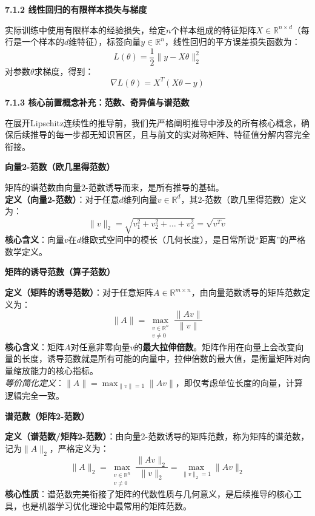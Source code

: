 \documentclass[10pt]{article}
\numberwithin{equation}{section}
\theoremstyle{plain}
\theoremstyle{definition}
\theoremstyle{remark}
\begin{document}
{\par\vspace{0.8ex}\noindent\normalsize\bfseries\color{secblue} 7.1.2 线性回归的有限样本损失与梯度\par}
实际训练中使用有限样本的经验损失，给定$n$个样本组成的特征矩阵$X \in \mathbb{R}^{n \times d}$（每行是一个样本的$d$维特征），标签向量$y \in \mathbb{R}^n$，线性回归的平方误差损失函数为：
\[ L(\theta) = \frac{1}{2} \| y - X \theta \|_2^2 \]
对参数$\theta$求梯度，得到：
\[ \nabla L(\theta) = X^T (X \theta - y) \]

{\par\vspace{0.8ex}\noindent\normalsize\bfseries\color{secblue} 7.1.3 核心前置概念补充：范数、奇异值与谱范数\par}
在展开Lipschitz连续性的推导前，我们先严格阐明推导中涉及的所有核心概念，确保后续推导的每一步都无知识盲区，且与前文的实对称矩阵、特征值分解内容完全衔接。

{\par\vspace{0.8ex}\noindent\normalsize\bfseries\color{accentD} 向量2-范数（欧几里得范数）\par}
矩阵的谱范数由向量2-范数诱导而来，是所有推导的基础。\\
\textbf{定义（向量2-范数）}：对于任意$d$维列向量$v \in \mathbb{R}^d$，其2-范数（欧几里得范数）定义为：
\[ \|v\|_2 = \sqrt{v_1^2 + v_2^2 + \dots + v_d^2} = \sqrt{v^T v} \]
\textbf{核心含义}：向量$v$在$d$维欧式空间中的模长（几何长度），是日常所说“距离”的严格数学定义。

{\par\vspace{0.8ex}\noindent\normalsize\bfseries\color{accentD} 矩阵的诱导范数（算子范数）\par}
\textbf{定义（矩阵的诱导范数）}：对于任意矩阵$A \in \mathbb{R}^{m \times n}$，由向量范数诱导的矩阵范数定义为：
\[ \|A\| = \max_{\substack{v \in \mathbb{R}^n \\ v \neq 0}} \frac{\|A v\|}{\|v\|} \]
\textbf{核心含义}：矩阵$A$对任意非零向量$v$的\textbf{最大拉伸倍数}。矩阵作用在向量上会改变向量的长度，诱导范数就是所有可能的向量中，拉伸倍数的最大值，是衡量矩阵对向量缩放能力的核心指标。\\
\textit{等价简化定义}：$\|A\| = \max_{\|v\|=1} \|A v\|$，即仅考虑单位长度的向量，计算逻辑完全一致。

{\par\vspace{0.8ex}\noindent\normalsize\bfseries\color{accentD} 谱范数（矩阵2-范数）\par}
\textbf{定义（谱范数/矩阵2-范数）}：由向量2-范数诱导的矩阵范数，称为矩阵的谱范数，记为$\|A\|_2$，严格定义为：
\[ \|A\|_2 = \max_{\substack{v \in \mathbb{R}^n \\ v \neq 0}} \frac{\|A v\|_2}{\|v\|_2} = \max_{\|v\|_2=1} \|A v\|_2 \]
\textbf{核心性质}：谱范数完美衔接了矩阵的代数性质与几何意义，是后续推导的核心工具，也是机器学习优化理论中最常用的矩阵范数。
\end{document}
